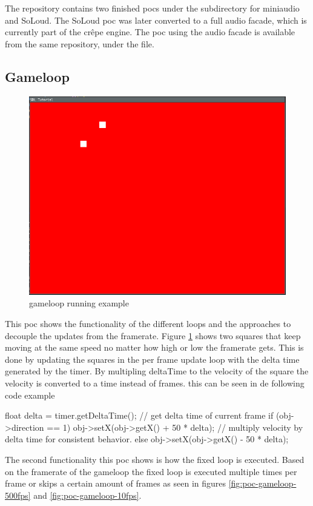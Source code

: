 \documentclass{projdoc}
\begin{document}
The repository \autocite{crepe:code-repo} contains two finished \glspl{poc} under the
 subdirectory for miniaudio and SoLoud. The SoLoud \gls{poc}
was later converted to a full audio \gls{facade}, which is currently part of the
cr\^epe engine. The \gls{poc} using the audio \gls{facade} is available from the same
repository, under the  file.
\subsection{Gameloop}
\label{poc:Gameloop}
\begin{figure}
	\centering
	\includegraphics[scale=0.4]{img/gameloop-squares.png}
	\caption{gameloop running example}
	\label{fig:poc-gameloop-squares}
\end{figure}
This \gls{poc} shows the functionality of the different loops and the approaches to decouple the updates from the framerate.
Figure \ref{fig:poc-gameloop-squares} shows two squares that keep moving at the same speed no matter how high or low the framerate gets.
This is done by updating the squares in the per frame update loop with the delta time generated by the timer.
By multipling deltaTime to the velocity of the square the velocity is converted to a time instead of frames.
this can be seen in de following code example
\begin{blockcode}
float delta = timer.getDeltaTime(); // get delta time of current frame
	if (obj->direction == 1) {
		obj->setX(obj->getX() + 50 * delta); // multiply velocity by delta time for consistent behavior.
	} else {
		obj->setX(obj->getX() - 50 * delta);
	}
\end{blockcode}
The second functionality this \gls{poc} shows is how the fixed loop is executed.
Based on the framerate of the gameloop the fixed loop is executed multiple times per frame or skips a certain amount of frames as seen in figures \ref{fig:poc-gameloop-500fps} and \ref{fig:poc-gameloop-10fps}.
\end{document}
